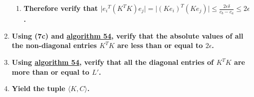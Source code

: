 \documentclass[twocolumn]{article}
\begin{document}
\begin{enumerate}
\begin{enumerate}
					\item \textbf{Therefore verify that $\lvert {e_i}^T(K^TK)e_j\rvert=\lvert(Ke_i)^T(Ke_j)\rvert\le\frac{2\epsilon\delta}{c_b-c_a}\le 2\epsilon$.}
				\end{enumerate}
				\item \textbf{Using (7c) and \hyperref[sec:algorithm 54]{algorithm 54}, verify that the absolute values of all the non-diagonal entries $K^TK$ are less than or equal to $2\epsilon$.}
				\item \textbf{Using \hyperref[sec:algorithm 54]{algorithm 54}, verify that all the diagonal entries of $K^TK$ are more than or equal to $L'$.}
				\item \textbf{Yield the tuple $\langle K,C\rangle$.}
			\end{enumerate}
\end{document}
